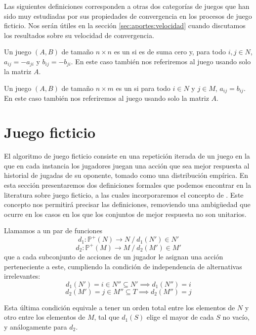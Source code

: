 Las siguientes definiciones corresponden a otras dos categorías de juegos que han sido muy estudiadas por sus propiedades de convergencia en los procesos de juego ficticio. Nos serán útiles en la sección \ref{sec:aportes:velocidad} cuando discutamos los resultados sobre su velocidad de convergencia.

\begin{definition}
    Un juego $(A, B)$ de tamaño $n \times n$ es un  si es de suma cero y, para todo $i, j \in N$, $a_{ij} = -a_{ji}$ y $b_{ij} = -b_{ji}$. En este caso también nos referiremos al juego usando solo la matriz $A$.
\end{definition}

\begin{definition}
    Un juego $(A, B)$ de tamaño $n \times m$ es un  si para todo $i \in N$ y $j \in M$, $a_{ij} = b_{ij}$. En este caso también nos referiremos al juego usando solo la matriz $A$.
\end{definition}


\section{Juego ficticio} \label{sec:def:fp}

El algoritmo de juego ficticio consiste en una repetición iterada de un juego en la que en cada instancia los jugadores juegan una acción que sea mejor respuesta al historial de jugadas de su oponente, tomado como una distribución empírica. En esta sección presentaremos dos definiciones formales que podemos encontrar en la literatura sobre juego ficticio, a las cuales incorporaremos el concepto de . Este concepto nos permitirá precisar las definiciones, removiendo una ambigüedad que ocurre en los casos en los que los conjuntos de mejor respuesta no son unitarios.

\begin{definition} \label{def:reglas:desempate}
    Llamamos  a un par de funciones
    \[ d_1: \mathbb{P}^+(N) \rightarrow N \ / \ d_1(N') \in N' \]
    \[ d_2: \mathbb{P}^+(M) \rightarrow M \ / \ d_2(M') \in M' \]
    que a cada subconjunto de acciones de un jugador le asignan una acción perteneciente a este, cumpliendo la condición de independencia de alternativas irrelevantes:
    \[ d_1(N') = i \in N'' \subseteq N' \implies  d_1(N'') = i \]
    \[ d_2(M') = j \in M'' \subseteq T  \implies  d_2(M'') = j \]

Esta última condición equivale a tener un orden total entre los elementos de $N$ y otro entre los elementos de $M$, tal que $d_1(S)$ elige el mayor de cada $S$ no vacío, y análogamente para $d_2$. 
\end{definition}

